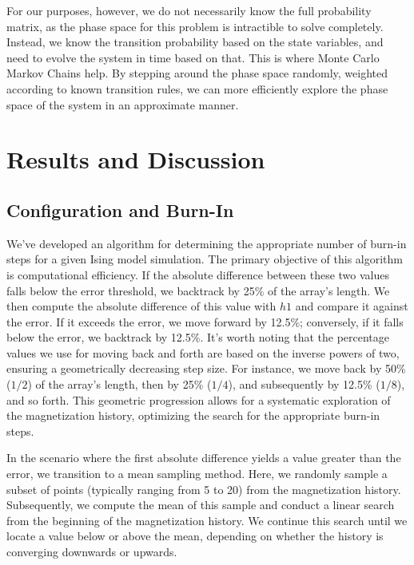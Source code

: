 \documentclass[%
 reprint,
 amsmath,amssymb,
 aps,
]{revtex4-2}
\begin{document}
For our purposes, however, we do not necessarily know the full probability matrix, as the phase space for this problem is intractible to solve completely. Instead, we know the transition probability based on the state variables, and need to evolve the system in time based on that. This is where Monte Carlo Markov Chains help. By stepping around the phase space randomly, weighted according to known transition rules, we can more efficiently explore the phase space of the system in an approximate manner.

\section{\label{sec:level1}Results and Discussion}
\subsection{\label{sec:level2}Configuration and Burn-In}
We've developed an algorithm for determining the appropriate number of burn-in steps for a given Ising model simulation. The primary objective of this algorithm is computational efficiency.
If the absolute difference between these two values falls below the error threshold, we backtrack by 25\% of the array's length. We then compute the absolute difference of this value with \(h1\) and compare it against the error. If it exceeds the error, we move forward by 12.5\%; conversely, if it falls below the error, we backtrack by 12.5\%. It's worth noting that the percentage values we use for moving back and forth are based on the inverse powers of two, ensuring a geometrically decreasing step size. For instance, we move back by 50\% (\(1/2\)) of the array's length, then by 25\% (\(1/4\)), and subsequently by 12.5\% (\(1/8\)), and so forth. This geometric progression allows for a systematic exploration of the magnetization history, optimizing the search for the appropriate burn-in steps.

In the scenario where the first absolute difference yields a value greater than the error, we transition to a mean sampling method. Here, we randomly sample a subset of points (typically ranging from 5 to 20) from the magnetization history. Subsequently, we compute the mean of this sample and conduct a linear search from the beginning of the magnetization history. We continue this search until we locate a value below or above the mean, depending on whether the history is converging downwards or upwards.
\end{document}
